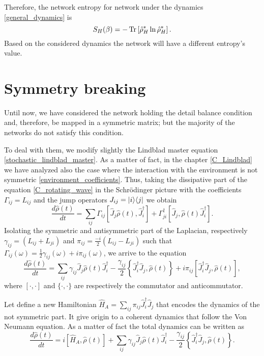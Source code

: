 Therefore, the network entropy for network under the dynamics \eqref{general_dynamics} is 
\begin{equation}
    S_H(\beta) = -\operatorname{Tr}\left[\hat\rho_H^*\ln\hat\rho_H^* \right].
\end{equation}
Based on the considered dynamics the network will have a different entropy's value.



\section{Symmetry breaking}

Until now, we have considered the network holding the detail balance condition and, therefore, be mapped in a symmetric matrix; 
but the majority of the networks do not satisfy this condition. 

To deal with them, we modify slightly the Lindblad master equation \eqref{stochastic_lindblad_master}. 
As a matter of fact, in the chapter \ref{C_Lindblad} we have analyzed also the case where the interaction with the environment is not symmetric \eqref{environment_coefficients}. Thus, taking the dissipative part of the equation \eqref{C_rotating_wave} in the Schrödinger picture with the coefficients $\Gamma_{ij} = L_{ij}$ and the jump operators $J_{ij} = \lvert i\rangle\langle j\rvert$ we obtain 
\begin{equation}
    \frac{d\hat\rho(t)}{dt} = \sum_{ij}\Gamma_{ij}\left[\hat J_j\hat\rho(t),\hat J_i^\dagger\right]+\Gamma_{ji}^\dagger\left[\hat J_j,\hat\rho(t)\hat J_i^\dagger\right].
\end{equation}
Isolating the symmetric and antisymmetric part of the Laplacian, respectively $\gamma_{ij} = \left(L_{ij} + L_{ji}\right)$ and $\pi_{ij} =  \frac{-i}{2}\left(L_{ij}-L_{ji}\right)$ such that $\Gamma_{ij}(\omega) =\frac{1}{2}\gamma_{ij}(\omega)+i\pi_{ij}(\omega)$, we arrive to the equation
\begin{equation}
    \frac{d\hat\rho(t)}{dt} = \sum_{ij}\gamma_{ij}\hat J_j\hat\rho(t)\hat J_i^\dagger -\frac{\gamma_{ij}}{2}\left\{\hat J_i^\dagger\hat J_j,\hat\rho(t)\right\} + i\pi_{ij}\left[\hat J_i^\dagger\hat J_j,\hat\rho(t)\right],
\end{equation}
where $[\cdot,\cdot]$ and $\{\cdot,\cdot\}$ are respectively the commutator and anticommutator.

Let define a new Hamiltonian $\hat H_{A} = \sum_{ij}\pi_{ij}\hat J_i^\dagger\hat J_j$ that encodes the dynamics of the not symmetric part. 
It give origin to a coherent dynamics that follow the Von Neumann equation. As a matter of fact the total dynamics can be written as
\begin{equation}\label{antisymmetric_master_equation}
    \frac{d\hat\rho(t)}{dt} = i\left[\hat H_{A},\hat\rho(t)\right] + \sum_{ij}\gamma_{ij}\hat J_j\hat\rho(t)\hat J_i^\dagger -\frac{\gamma_{ij}}{2}\left\{\hat J_i^\dagger\hat J_j,\hat\rho(t)\right\}.
\end{equation}

